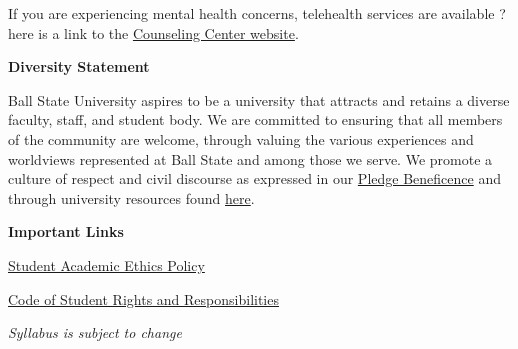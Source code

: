 \documentclass{article}
\begin{document}
If you are experiencing mental health concerns, telehealth services are available ? here is a link to the \href{https://www.bsu.edu/campuslife/counseling-center}{Counseling Center website}.\bigskip

\textbf{\large Diversity Statement}\medskip

Ball State University aspires to be a university that attracts and retains a diverse faculty, staff, and student body. We are committed to ensuring that all members of the community are welcome, through valuing the various experiences and worldviews represented at Ball State and among those we serve. We promote a culture of respect and civil discourse as expressed in our \href{https://www.bsu.edu/about/beneficence}{Pledge Beneficence} and through university resources found \href{http://bsu.edu/campuslife/multiculturalcenter}{here}.\bigskip

\textbf{\large Important Links}\medskip

\href{https://www.bsu.edu/about/administrativeoffices/vice-provost/student-services/academic-integrity}{Student Academic Ethics Policy}

\href{https://www.bsu.edu/about/administrativeoffices/student-conduct/policiesandprocedures}{Code of Student Rights and Responsibilities}\bigskip

\center \textit{Syllabus is subject to change}
\end{document}

